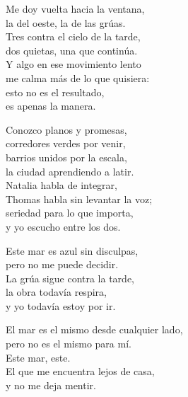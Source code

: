 \begin{lyrics}
Me doy vuelta hacia la ventana,\\
la del oeste, la de las grúas.\\
Tres contra el cielo de la tarde,\\
dos quietas, una que continúa.\\
Y algo en ese movimiento lento\\
me calma más de lo que quisiera:\\
esto no es el resultado,\\
es apenas la manera.

Conozco planos y promesas,\\
corredores verdes por venir,\\
barrios unidos por la escala,\\
la ciudad aprendiendo a latir.\\
Natalia habla de integrar,\\
Thomas habla sin levantar la voz;\\
seriedad para lo que importa,\\
y yo escucho entre los dos.

Este mar es azul sin disculpas,\\
pero no me puede decidir.\\
La grúa sigue contra la tarde,\\
la obra todavía respira,\\
y yo todavía estoy por ir.

El mar es el mismo desde cualquier lado,\\
pero no es el mismo para mí.\\
Este mar, este.\\
El que me encuentra lejos de casa,\\
y no me deja mentir.
\end{lyrics}

